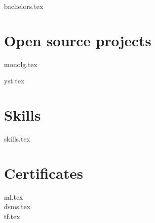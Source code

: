 \documentclass[]{deedy-resume-openfont}
\begin{document}
\sectionsep

{bachelors.tex}

\sectionsep


\section{Open source projects}

{monolg.tex}

\sectionsep

{yst.tex}

\sectionsep


\section{Skills}
{skills.tex}

\sectionsep

\section{Certificates}
{ml.tex}
\vspace{\topsep}\\
{dsms.tex}
\vspace{\topsep}\\
{tf.tex}
\end{document}
